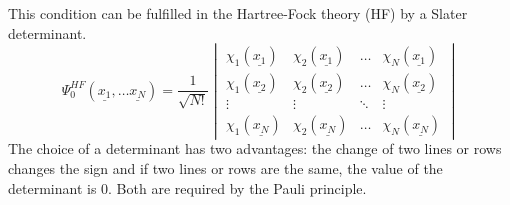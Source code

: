 \documentclass[11pt,DIV=13,BCOR=5mm,a4paper,headinclude]{scrbook}
\renewcommand{\vec}[1]{\underline{#1}}
\begin{document}
This condition can be fulfilled in the Hartree-Fock theory (HF) by a Slater determinant.
\begin{equation}
\Psi^{HF}_{0}({\vec{x_1}},\dots\vec{x_N}) = \frac{1}{\sqrt{N!}}\begin{vmatrix}{\chi_1}({\vec{x_1}})&{\chi_2}({\vec{x_1}})&\dots&{\chi_N}({\vec{x_1}})\\
{\chi_1}({\vec{x_2}})&{\chi_2}({\vec{x_2}})&\dots&{\chi_N}({\vec{x_2}})\\
 \vdots&\vdots&\ddots&\vdots \\
{\chi_1}({\vec{x_N}})&{\chi_2}({\vec{x_N}})&\dots&{\chi_N}({\vec{x_N}})
\end{vmatrix} 
\end{equation}
The choice of a determinant has two advantages: the change of two lines or rows changes the sign and if two lines or rows are the same, the value of the determinant is $0$. Both  are required by the Pauli principle.
\end{document}
